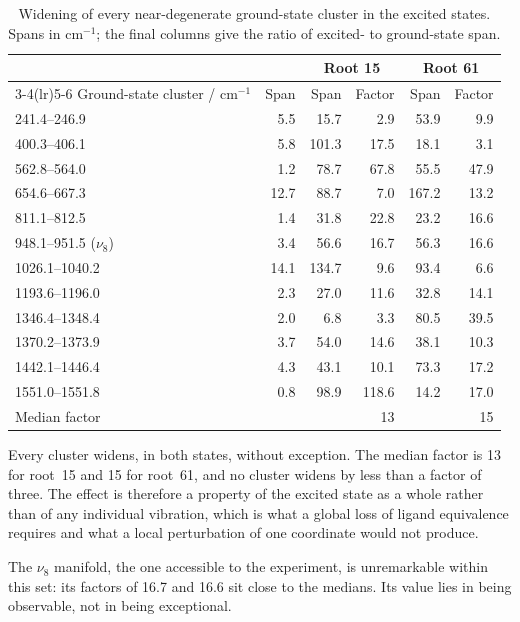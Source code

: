 \documentclass[11pt,a4paper]{article}
\newcommand{\wn}{\ensuremath{\mathrm{cm^{-1}}}}
\begin{document}
\begin{table}[htbp]
\centering
\caption{Widening of every near-degenerate ground-state cluster in the
excited states. Spans in \wn{}; the final columns give the ratio of excited-
to ground-state span.}
\label{tab:widen}
\begin{tabular}{l r rr rr}
\toprule
& & \multicolumn{2}{c}{Root 15} & \multicolumn{2}{c}{Root 61} \\
\cmidrule(lr){3-4}\cmidrule(lr){5-6}
Ground-state cluster / \wn{} & Span & Span & Factor & Span & Factor \\
\midrule
241.4--246.9   &  5.5 &  15.7 &  2.9 &  53.9 &  9.9 \\
400.3--406.1   &  5.8 & 101.3 & 17.5 &  18.1 &  3.1 \\
562.8--564.0   &  1.2 &  78.7 & 67.8 &  55.5 & 47.9 \\
654.6--667.3   & 12.7 &  88.7 &  7.0 & 167.2 & 13.2 \\
811.1--812.5   &  1.4 &  31.8 & 22.8 &  23.2 & 16.6 \\
948.1--951.5 ($\nu_8$) & 3.4 & 56.6 & 16.7 & 56.3 & 16.6 \\
1026.1--1040.2 & 14.1 & 134.7 &  9.6 &  93.4 &  6.6 \\
1193.6--1196.0 &  2.3 &  27.0 & 11.6 &  32.8 & 14.1 \\
1346.4--1348.4 &  2.0 &   6.8 &  3.3 &  80.5 & 39.5 \\
1370.2--1373.9 &  3.7 &  54.0 & 14.6 &  38.1 & 10.3 \\
1442.1--1446.4 &  4.3 &  43.1 & 10.1 &  73.3 & 17.2 \\
1551.0--1551.8 &  0.8 &  98.9 & 118.6 & 14.2 & 17.0 \\
\midrule
\multicolumn{2}{l}{Median factor} & & 13 & & 15 \\
\bottomrule
\end{tabular}
\end{table}

Every cluster widens, in both states, without exception. The median factor is
13 for root~15 and 15 for root~61, and no cluster widens by less than a factor
of three. The effect is therefore a property of the excited state as a whole
rather than of any individual vibration, which is what a global loss of ligand
equivalence requires and what a local perturbation of one coordinate would not
produce.

The $\nu_8$ manifold, the one accessible to the experiment, is unremarkable
within this set: its factors of 16.7 and 16.6 sit close to the medians. Its
value lies in being observable, not in being exceptional.
\end{document}
